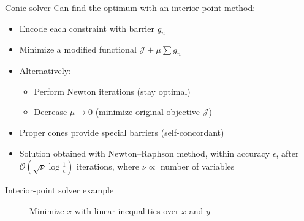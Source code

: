 \documentclass{beamer}  %
\begin{document}
\begin{frame}{Conic solver}
    Can find the optimum with an interior-point method:
    \begin{itemize}
        \item Encode each constraint with barrier $g_n$
        \item Minimize a modified functional $\mathcal{J} + \mu\sum g_n$
        \item Alternatively:
        \begin{itemize}
            \item Perform Newton iterations (stay optimal)
            \item Decrease $\mu \to 0$ (minimize original objective $\mathcal{J}$)
        \end{itemize} 
        \item Proper cones provide special barriers (self-concordant)
        \item Solution obtained with Newton–Raphson method, within accuracy $\epsilon$, after $\mathcal{O}(\sqrt{\nu} \log \frac{1}{\epsilon})$ iterations, where $\nu\propto$ number of variables
    \end{itemize}
\end{frame}

\begin{frame}{Interior-point solver example}
    \begin{figure}
        \centering
        \caption*{Minimize $x$ with linear inequalities over $x$ and $y$}
    \end{figure}
\end{frame}
\end{document}
